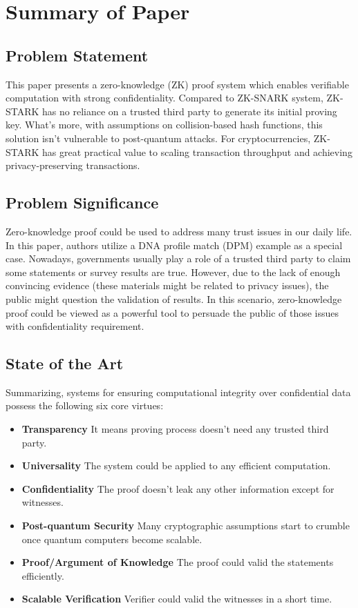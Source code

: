 \documentclass[conference]{IEEEtran}
\begin{document}
\section{Summary of Paper \cite{ben2018scalable}}

\subsection{Problem Statement}
This paper presents a zero-knowledge (ZK) proof system which enables verifiable computation with strong confidentiality.
%
Compared to ZK-SNARK system, ZK-STARK has no reliance on a trusted third party to generate its initial proving key.
%
What's more, with assumptions on collision-based hash functions, this solution isn't vulnerable to post-quantum attacks.
%
For cryptocurrencies, ZK-STARK has great practical value to scaling transaction throughput and achieving privacy-preserving transactions. 

\subsection{Problem Significance}
Zero-knowledge proof could be used to address many trust issues in our daily life.
%
In this paper, authors utilize a DNA profile match (DPM) example as a special case.
%
Nowadays, governments usually play a role of a trusted third party to claim some statements or survey results are true.
%
However, due to the lack of enough convincing evidence (these materials might be related to privacy issues), the public might question the validation of results. 
%
In this scenario, zero-knowledge proof could be viewed as a powerful tool to persuade the public of those issues with confidentiality requirement.


\subsection{State of the Art}
Summarizing, systems for ensuring computational integrity over confidential data possess the following six core virtues:

\begin{itemize}
    \item \textbf{Transparency} It means proving process doesn't need any trusted third party.
    \item \textbf{Universality} The system could be applied to any efficient computation.
    \item \textbf{Confidentiality} The proof doesn't leak any other information except for witnesses.
    \item \textbf{Post-quantum Security} Many cryptographic assumptions start to crumble once quantum computers become scalable.
    \item \textbf{Proof/Argument of Knowledge} The proof could valid the statements efficiently.
    \item \textbf{Scalable Verification} Verifier could valid the witnesses in a short time.
\end{itemize}
\end{document}
